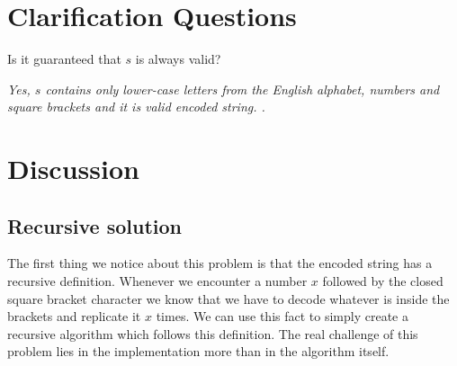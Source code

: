 \section{Clarification Questions}

\begin{QandA}
	\item Is it guaranteed that $s$ is always valid?
	\begin{answered}
		\textit{Yes, $s$ contains only lower-case letters from the English alphabet, numbers and square brackets and it is valid encoded string. .}
	\end{answered}

\end{QandA}

\section{Discussion}
\label{decode_string:sec:discussion}


\subsection{Recursive solution}
\label{decode_string:sec:recursive}
The first thing we notice about this problem is that the encoded string has a recursive definition.
Whenever we encounter a number $x$ followed by the closed square bracket character  \inline{'['} 
we know that we have
to decode whatever is inside the brackets and replicate it $x$ times.
We can use this fact to simply create a recursive algorithm which follows this definition.
The real challenge of this
problem lies in the implementation more than in the algorithm itself.

